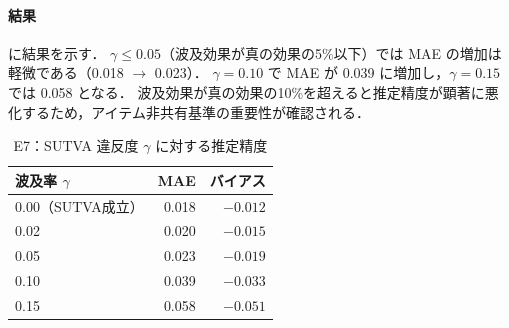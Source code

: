 \paragraph{結果}
 に結果を示す．
$\gamma \leq 0.05$（波及効果が真の効果の5\%以下）では MAE の増加は軽微である（0.018 $\to$ 0.023）．
$\gamma = 0.10$ で MAE が 0.039 に増加し，$\gamma = 0.15$ では 0.058 となる．
波及効果が真の効果の10\%を超えると推定精度が顕著に悪化するため，アイテム非共有基準の重要性が確認される．

\begin{table}[t]
\centering
\caption{E7：SUTVA 違反度 $\gamma$ に対する推定精度}
\label{tab:sutva}
\small
\begin{tabular}{lrr}
\toprule
波及率 $\gamma$ & MAE & バイアス \\
\midrule
0.00（SUTVA成立） & 0.018 & $-0.012$ \\
0.02 & 0.020 & $-0.015$ \\
0.05 & 0.023 & $-0.019$ \\
0.10 & 0.039 & $-0.033$ \\
0.15 & 0.058 & $-0.051$ \\
\bottomrule
\end{tabular}
\end{table}
